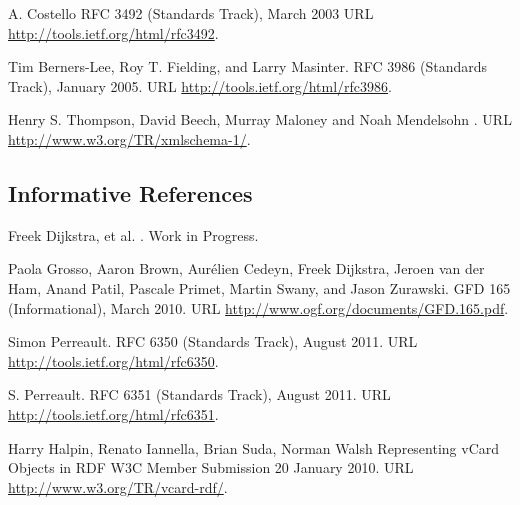 \begin{thebibliography}{10}
A. Costello
\newblock RFC 3492 (Standards Track), March 2003
\newblock URL \url{http://tools.ietf.org/html/rfc3492}.

Tim Berners-Lee, Roy T. Fielding, and Larry Masinter.
\newblock RFC 3986 (Standards Track), January 2005.
\newblock URL \url{http://tools.ietf.org/html/rfc3986}.

Henry S. Thompson, David Beech, Murray Maloney and Noah Mendelsohn
.
\newblock URL \url{http://www.w3.org/TR/xmlschema-1/}.

\end{thebibliography}

\subsection*{Informative References}

\begin{thebibliography}{10}
\vspace*{-3em}

Freek Dijkstra, et al.
.
\newblock Work in Progress.

Paola Grosso, Aaron Brown, Aur\'elien Cedeyn, Freek Dijkstra, Jeroen van der Ham, Anand Patil, Pascale Primet, Martin Swany, and Jason Zurawski.
\newblock GFD 165 (Informational), March 2010.
\newblock URL \url{http://www.ogf.org/documents/GFD.165.pdf}.

Simon Perreault.
\newblock RFC 6350 (Standards Track), August 2011.
\newblock URL \url{http://tools.ietf.org/html/rfc6350}.

S. Perreault.
\newblock RFC 6351 (Standards Track), August 2011.
\newblock URL \url{http://tools.ietf.org/html/rfc6351}.

 Harry Halpin, Renato Iannella, Brian Suda, Norman Walsh
\newblock Representing vCard Objects in RDF
\newblock W3C Member Submission 20 January 2010.
\newblock URL \url{http://www.w3.org/TR/vcard-rdf/}.


\end{thebibliography}
